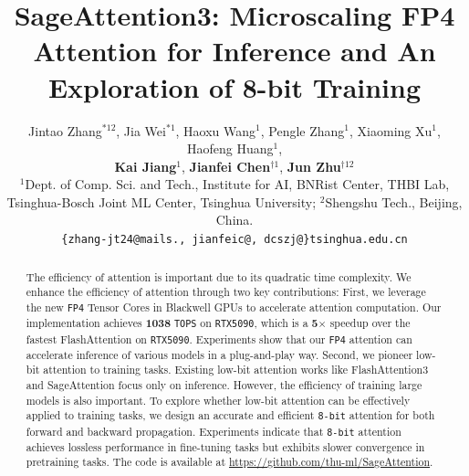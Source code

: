 \documentclass{article}
\title{SageAttention3: Microscaling FP4 Attention for Inference and An Exploration of 8-bit Training}
\author{%
Jintao Zhang$^{*12}$, 
Jia Wei$^{*1}$, 
Haoxu Wang$^{1}$, 
Pengle Zhang$^{1}$, 
Xiaoming Xu$^{1}$, 
Haofeng Huang$^{1}$,\\
\textbf{Kai Jiang}$^{1}$, 
\textbf{Jianfei Chen}$^{\dagger1}$, 
\textbf{Jun Zhu}$^{\dagger12}$\\[1mm]
$^{1}$Dept. of Comp. Sci. and Tech., Institute for AI, BNRist Center, THBI Lab,\\
Tsinghua-Bosch Joint ML Center, Tsinghua University; \quad $^{2}$Shengshu Tech., Beijing, China.\\[1mm]
\texttt{\{zhang-jt24@mails., jianfeic@, dcszj@\}tsinghua.edu.cn}
}
\theoremstyle{plain}
\theoremstyle{definition}
\theoremstyle{remark}
\newcommand{\our}{\texttt{SageAttention3}\xspace}
\begin{document}
\maketitle

{\renewcommand{\thefootnote}{}}

\begin{abstract}
The efficiency of attention is important due to its quadratic time complexity. We enhance the efficiency of attention through two key contributions: 
First, we leverage the new \texttt{FP4} Tensor Cores in Blackwell GPUs to accelerate attention computation. Our implementation achieves \textbf{1038} \texttt{TOPS} on \texttt{RTX5090}, which is a \textbf{5}$\times$ speedup over the fastest FlashAttention on \texttt{RTX5090}. Experiments show that our \texttt{FP4} attention can accelerate inference of various models in a plug-and-play way.
Second, we pioneer low-bit attention to training tasks. Existing low-bit attention works like FlashAttention3 and SageAttention focus only on inference. However, the efficiency of training large models is also important. To explore whether low-bit attention can be effectively applied to training tasks, we design an accurate and efficient \texttt{8-bit} attention for both forward and backward propagation. Experiments indicate that \texttt{8-bit} attention achieves lossless performance in fine-tuning tasks but exhibits slower convergence in pretraining tasks. The code is available at \url{https://github.com/thu-ml/SageAttention}.
  
  
  
 
  
  





\end{abstract}
\end{document}
